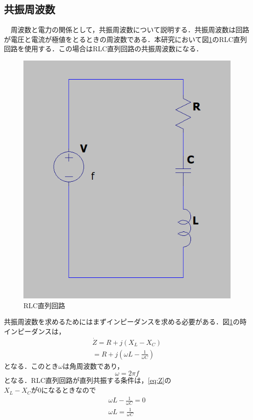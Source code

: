 \documentclass[12pt]{jarticle}
\begin{document}
\subsection{共振周波数}
　周波数と電力の関係として，共振周波数について説明する．共振周波数は回路が電圧と電流が極値をとるときの周波数である．本研究において図\ref{fig:RLC}のRLC直列回路を使用する．この場合はRLC直列回路の共振周波数になる．
\begin{figure}[H]
	\centering
	\includegraphics[scale=0.5]{RLC.png}
	\caption{RLC直列回路}
	\label{fig:RLC}
\end{figure}
共振周波数を求めるためにはまずインピーダンスを求める必要がある．図\ref{fig:RLC}の時インピーダンスは，
\begin{eqnarray}
\label{eq:Z}
\dot{Z}=R+j(X_L-X_C) \nonumber\\
=R+j(\omega L-\frac{1}{\omega C})
\end{eqnarray}
となる．このとき$\omega$は角周波数であり，
\begin{equation}
\label{eq:omega}
\omega=2 \pi f
\end{equation}
となる．RLC直列回路が直列共振する条件は，\ref{eq:Z}の$X_L-X_Cが0になるときなので$
\begin{eqnarray}
\omega L-\frac{1}{\omega C}=0　\nonumber \\
\label{eq:zyouken}
\omega L=\frac{1}{\omega C}
\end{eqnarray}
\end{document}
